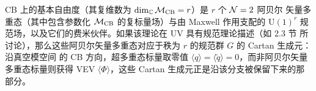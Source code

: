 CB 上的基本自由度（其复维数为 $\dim_{\mathbb{C}}\mathcal{M}_{\mathrm{CB}}=r$）是 $r$ 个 $\mathcal{N}=2$ 阿贝尔
矢量多重态（其中包含参数化 $\mathcal{M}_{\mathrm{CB}}$ 的复标量场）与由 Maxwell 作用支配的
$\mathrm{U}(1)^r$ 规范场，以及它们的费米伙伴。如果该理论在 UV 具有规范理论描述（如 2.3 节
所讨论），那么这些阿贝尔矢量多重态对应于秩为 $r$ 的规范群 $G$ 的 Cartan 生成元：沿真空模空间
的 CB 方向，超多重态标量取零值 $\langle q\rangle=\langle\tilde q\rangle=0$，而非阿贝尔矢量
多重态标量则获得 VEV $\langle\Phi\rangle$，这些 Cartan 生成元正是沿该分支被保留下来的那部分。


